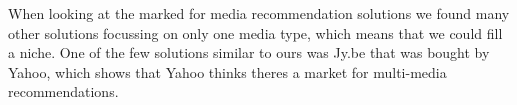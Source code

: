 When looking at the marked for media recommendation solutions we found many other solutions focussing on only one media type, which means that we could fill a niche. One of the few solutions similar to ours was Jy.be that was bought by Yahoo, which shows that Yahoo thinks theres a market for multi-media recommendations. 